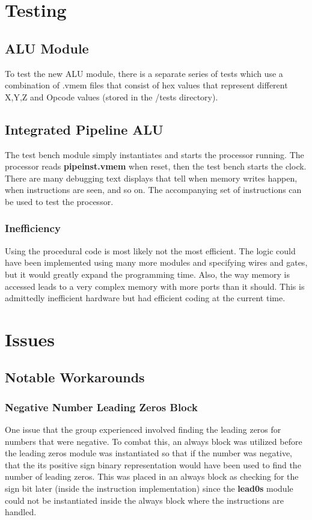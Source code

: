 \documentclass[conference]{IEEEtran}
\begin{document}

\section{Testing}

\subsection{ALU Module}
To test the new ALU module, there is a separate series of tests which use a combination of .vmem files
that consist of hex values that represent different X,Y,Z and Opcode values (stored in the /tests directory). 

\subsection{Integrated Pipeline ALU }
The test bench module simply instantiates and starts the processor running. The processor reads
\textbf{pipeinst.vmem} when reset, then the test bench starts the clock. There are many debugging text displays that tell when memory writes happen, when instructions are seen, and so on. The accompanying set of instructions can be used to test the processor.

\subsubsection{Inefficiency}
Using the procedural code is most likely not the most efficient. The logic could have been implemented
using many more modules and specifying wires and gates, but it would greatly expand the programming
time. Also, the way memory is accessed leads to a very complex memory with more ports than it should.
This is admittedly inefficient hardware but had efficient coding at the current time.

\section{Issues}
\subsection{Notable Workarounds}
\subsubsection{Negative Number Leading Zeros Block}
One issue that the group experienced involved finding the leading zeros for numbers that were 
negative. To combat this, an always block was utilized before the leading zeros module was instantiated
so that if the number was negative, that the its positive sign binary representation would have been
used to find the number of leading zeros. This was placed in an always block as checking for the sign bit later 
(inside the instruction implementation) since the \textbf{lead0s} module could not be instantiated inside
the always block where the instructions are handled. 
\end{document}
